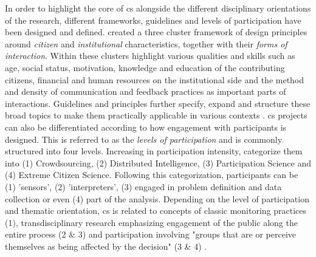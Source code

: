 In order to highlight the core of \acrshort{cs} alongside the different disciplinary orientations of the research, different frameworks, guidelines and levels of participation have been designed and defined. \autocite{kirschkeCitizenScienceProjects2022} created a three cluster framework of design principles around \textit{citizen} and \textit{institutional} characteristics, together with their \textit{forms of interaction}. Within these clusters \autocite{kirschkeCitizenScienceProjects2022} highlight various qualities and skills such as age, social status, motivation, knowledge and education of the contributing citizens, financial and human resources on the institutional side and the method and density of communication and feedback practices as important parts of interactions. Guidelines and principles further specify, expand and structure these broad topics to make them practically applicable in various contexts \autocite{citizenscience.govBasicStepsYour,escaTenPrinciplesCitizen2015,escaECSACharacteristicsCitizen2020,EUCitizenScience2023,fraislCitizenScienceEnvironmental2022,garciaFindingWhatYou2021,minkmanCitizenScienceWater2015,pocockStrategicFrameworkSupport,skarlatidouWhatVolunteersWant2019}.\newline
\acrlong{cs} projects can also be differentiated according to how engagement with participants is designed. This is referred to as the \textit{levels of participation} and is commonly structured into four levels. Increasing in participation intensity, \autocite{buckinghamshumGlobalParticipatoryPlatform2012} categorize them into (1) Crowdsourcing, (2) Distributed Intelligence, (3) Participation Science and (4) Extreme Citizen Science. Following this categorization, participants can be (1) 'sensors', (2) 'interpreters', (3) engaged in problem definition and data collection or even (4) part of the analysis.\newline
Depending on the level of participation and thematic orientation, \acrshort{cs} is related to concepts of classic monitoring practices (1), transdisciplinary research emphasizing engagement of the public along the entire process (2 \& 3) and participation involving "groups that are or perceive themselves as being affected by the decision" (3 \& 4) \autocites{buckinghamshumGlobalParticipatoryPlatform2012}{conradReviewCitizenScience2011}{minkmanCitizenScienceWater2015}[1]{rennParticipatoryProcessesDesigning2006}.\newline
